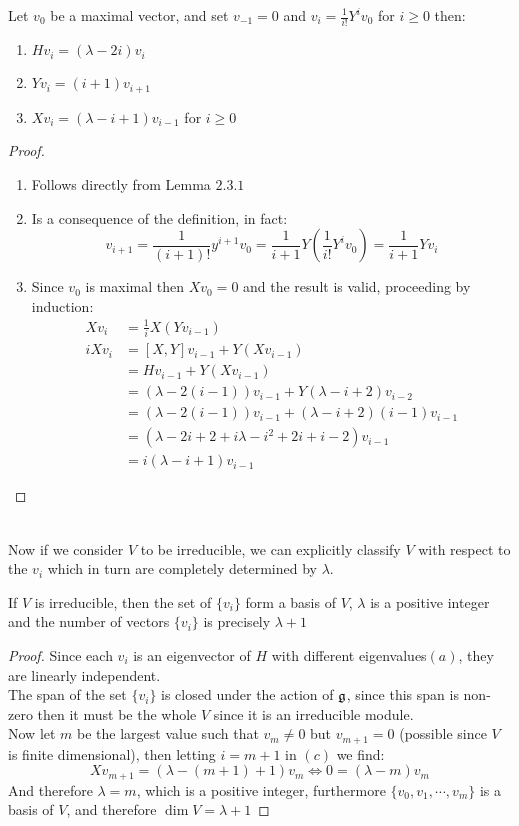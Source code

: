 \begin{lema}
Let $v_0$ be a maximal vector, and set $v_{-1}=0$ and $v_{i}=\frac{1}{i!}Y^iv_0$ for $i\ge 0$ then:
\begin{enumerate}[label=(\alph*)]
	\item $Hv_i = (\lambda - 2i)v_i$
	\item $Yv_i = (i+1)v_{i+1}$
	\item $Xv_i = (\lambda-i+1)v_{i-1}$ for $i\ge0$
\end{enumerate}
\end{lema}
\begin{proof}
	\begin{enumerate}[label=(\alph*)]
		\item Follows directly from Lemma $2.3.1$
		\item Is a consequence of the definition, in fact:
		$$v_{i+1} = \frac{1}{(i+1)!}y^{i+1}v_0 = \frac{1}{i+1} Y\left(\frac{1}{i!}Y^i v_0\right) = \frac{1}{i+1} Yv_i$$
		\item Since $v_0$ is maximal then $Xv_0=0$ and the result is valid, proceeding by induction:
		\begin{align*}
		Xv_i &= \frac{1}{i}X(Yv_{i-1})\\
		iXv_i&= [X,Y]v_{i-1} + Y(Xv_{i-1})\\
			 &= Hv_{i-1} + Y(Xv_{i-1})\\
			 &= (\lambda-2(i-1))v_{i-1} + Y(\lambda - i + 2)v_{i-2}\\
			 &= (\lambda-2(i-1))v_{i-1} + (\lambda - i + 2)(i-1)v_{i-1}\\
			 &=  (\lambda - 2i + 2 + i\lambda - i^2 + 2i + i - 2)v_{i-1}\\
			 &= i(\lambda-i+1)v_{i-1}
		\end{align*}
	\end{enumerate}
\end{proof}\\
Now if we consider $V$ to be irreducible, we can explicitly classify $V$ with respect to the $v_i$ which in turn are completely determined by $\lambda$.
\begin{teo}
If $V$ is irreducible, then the set of $\{v_i\}$ form a basis of $V$, $\lambda$ is a positive integer and the number of vectors $\{v_i\}$ is precisely $\lambda+1$
\end{teo}
\begin{proof}
	Since each $v_i$ is an eigenvector of $H$ with different eigenvalues$(a)$, they are linearly independent.\\
	The span of the set $\{v_i\}$ is closed under the action of $\mathfrak{g}$, since this span is non-zero then it must be the whole $V$ since it is an irreducible module.\\
	Now let $m$ be the largest value such that $v_m \not=0$ but $v_{m+1}=0$ (possible since $V$ is finite dimensional), then letting $i=m+1$ in $(c)$ we find:
	$$Xv_{m+1} = (\lambda - (m+1)+1)v_m \iff 0 = (\lambda-m)v_m$$
	And therefore $\lambda=m$, which is a positive integer, furthermore $\{v_0,v_1,\cdots,v_m\}$ is a basis of $V$, and therefore $\dim V = \lambda + 1$
\end{proof}
